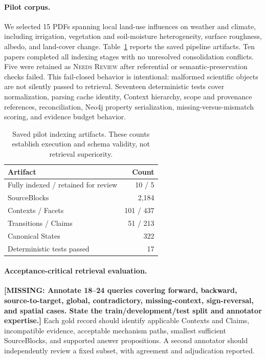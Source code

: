 \documentclass{article}
\newcommand{\missing}[1]{\textcolor{missingred}{\textbf{[MISSING: #1]}}}
\begin{document}
\paragraph{Pilot corpus.}
We selected 15 PDFs spanning local land-use influences on weather and climate,
including irrigation, vegetation and soil-moisture heterogeneity, surface
roughness, albedo, and land-cover change. Table~\ref{tab:indexing} reports the
saved pipeline artifacts. Ten papers completed all indexing stages with no
unresolved consolidation conflicts. Five were retained as \textsc{Needs Review}
after referential or semantic-preservation checks failed. This fail-closed
behavior is intentional: malformed scientific objects are not silently passed
to retrieval. Seventeen deterministic tests cover normalization, parsing cache
identity, Context hierarchy, scope and provenance references, reconciliation,
Neo4j property serialization, missing-versus-mismatch scoring, and evidence
budget behavior.

\begin{table}[t]
\centering
\small
\caption{Saved pilot indexing artifacts. These counts establish execution and
schema validity, not retrieval superiority.}
\label{tab:indexing}
\begin{tabular}{lr}
\toprule
Artifact & Count \\
\midrule
Fully indexed / retained for review & 10 / 5 \\
SourceBlocks & 2,184 \\
Contexts / Facets & 101 / 437 \\
Transitions / Claims & 51 / 213 \\
Canonical States & 322 \\
Deterministic tests passed & 17 \\
\bottomrule
\end{tabular}
\end{table}

\paragraph{Acceptance-critical retrieval evaluation.}
\missing{Annotate 18--24 queries covering forward, backward, source-to-target,
global, contradictory, missing-context, sign-reversal, and spatial cases. State
the train/development/test split and annotator expertise.} Each gold record
should identify applicable Contexts and Claims, incompatible evidence,
acceptable mechanism paths, smallest sufficient SourceBlocks, and supported
answer propositions. A second annotator should independently review a fixed
subset, with agreement and adjudication reported.
\end{document}
